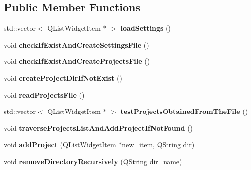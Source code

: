 \subsection*{Public Member Functions}
\begin{DoxyCompactItemize}
\item 
std\+::vector$<$ Q\+List\+Widget\+Item $\ast$ $>$ {\bfseries load\+Settings} ()\hypertarget{class_app_settings_adaf2c6920769fe633bb457817f25e712}{}\label{class_app_settings_adaf2c6920769fe633bb457817f25e712}

\item 
void {\bfseries check\+If\+Exist\+And\+Create\+Settings\+File} ()\hypertarget{class_app_settings_ad43966b109460eec7c4b6966e6beda50}{}\label{class_app_settings_ad43966b109460eec7c4b6966e6beda50}

\item 
void {\bfseries check\+If\+Exist\+And\+Create\+Projects\+File} ()\hypertarget{class_app_settings_a220584efc9258a4a4ce2e7710764cdca}{}\label{class_app_settings_a220584efc9258a4a4ce2e7710764cdca}

\item 
void {\bfseries create\+Project\+Dir\+If\+Not\+Exist} ()\hypertarget{class_app_settings_a61b0424424801e331beff01f6345ddd9}{}\label{class_app_settings_a61b0424424801e331beff01f6345ddd9}

\item 
void {\bfseries read\+Projects\+File} ()\hypertarget{class_app_settings_ae93d08cd7ef4975a4be2f4078dc524af}{}\label{class_app_settings_ae93d08cd7ef4975a4be2f4078dc524af}

\item 
std\+::vector$<$ Q\+List\+Widget\+Item $\ast$ $>$ {\bfseries test\+Projects\+Obtained\+From\+The\+File} ()\hypertarget{class_app_settings_abe01ed44f0d2790df49cd143e5b82331}{}\label{class_app_settings_abe01ed44f0d2790df49cd143e5b82331}

\item 
void {\bfseries traverse\+Projects\+List\+And\+Add\+Project\+If\+Not\+Found} ()\hypertarget{class_app_settings_af3235d6de06a69317c1a97b18ab5636b}{}\label{class_app_settings_af3235d6de06a69317c1a97b18ab5636b}

\item 
void {\bfseries add\+Project} (Q\+List\+Widget\+Item $\ast$new\+\_\+item, Q\+String dir)\hypertarget{class_app_settings_ae4f91140a8f1878e54b0a521821bee68}{}\label{class_app_settings_ae4f91140a8f1878e54b0a521821bee68}

\item 
void {\bfseries remove\+Directory\+Recursively} (Q\+String dir\+\_\+name)\hypertarget{class_app_settings_a3025ec525241da0334a825ebf366a7a1}{}\label{class_app_settings_a3025ec525241da0334a825ebf366a7a1}


\end{DoxyCompactItemize}
